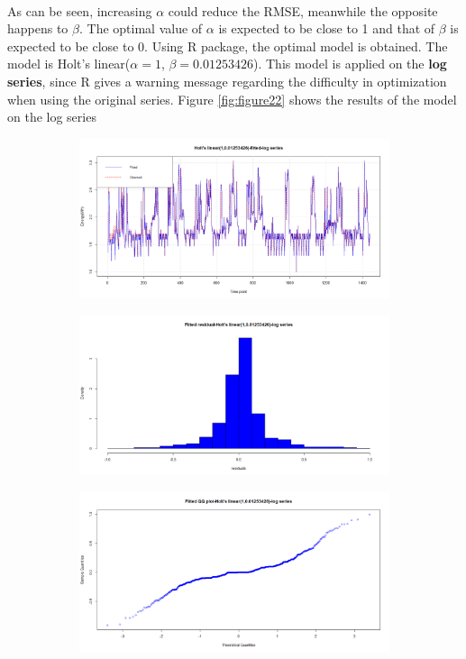 \documentclass[12pt]{article}
\begin{document}
\paragraph{}
As can be seen, increasing $\alpha$ could reduce the RMSE, meanwhile the opposite happens to $\beta$. The optimal value of $\alpha$ is expected to be close to 1 and that of $\beta$ is expected to be close to 0. Using R package, the optimal model is obtained. The model is Holt's linear($\alpha=1$, $\beta=0.01253426$). This model is applied on the \textbf{log series}, since R gives a warning message regarding the difficulty in optimization when using the original series. Figure \ref{fig:figure22} shows the results of the model on the log series
\begin{figure}[H]
  \centering
  \begin{subfigure}[b]{0.49\linewidth}
    \includegraphics[width=\linewidth]{figure21-1.png}
  \end{subfigure}
  \begin{subfigure}[b]{0.49\linewidth}
    \includegraphics[width=\linewidth]{figure21-2.png}
  \end{subfigure}
  \begin{subfigure}[b]{0.49\linewidth}
    \includegraphics[width=\linewidth]{figure21-3.png}

\end{subfigure}
\end{figure}
\end{document}
